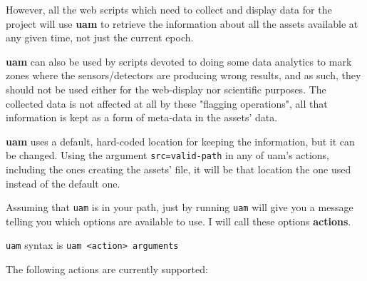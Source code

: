 \documentclass[12pt]{amsart}
\begin{document}
However, all the web scripts which need to collect and display data for the project will use {\bf uam} to retrieve the information about all the assets available at any given time, not just the current epoch.

{\bf uam} can also be used by scripts devoted to doing some data analytics to mark zones where the sensors/detectors are producing wrong results, and as such, they should not be used either for the web-display nor scientific purposes.  The collected data is not affected at all by these "flagging operations", all that information is kept as a form of meta-data in the assets' data.

{\bf uam} uses a default, hard-coded location for keeping the information, but it can be changed. Using the argument {\tt src=valid-path} in any of uam's actions, including the ones creating the assets' file, it will be that location the one used instead of the default one.


Assuming that {\tt uam} is in your path, just by running {\tt uam} will give you a message telling you which options are available to use. I will call these options {\bf actions}.

{\tt uam} syntax is {\tt uam <action> arguments}

The following actions are currently supported:
\end{document}
